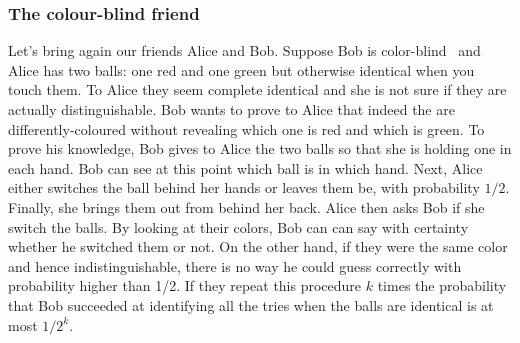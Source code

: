 \subsubsection{The colour-blind friend}

Let's bring again our friends Alice and Bob. Suppose Bob is color-blind~\cite{zkp:colour_blind} and Alice has two balls: one red and one green but otherwise identical when you touch them.
To Alice they seem complete identical and she is not sure if they are actually distinguishable. Bob wants to prove to Alice that indeed the are differently-coloured
without revealing which one is red and which is green. To prove his knowledge, Bob gives to Alice the two balls so that she is holding one in each hand. Bob can see
at this point which ball is in which hand. Next, Alice either switches the ball behind her hands or leaves them be, with probability $1/2$. Finally, she brings
them out from behind her back. Alice then asks Bob if she switch the balls. By looking at their colors, Bob can can say with certainty whether he switched them or not.
On the other hand, if they were the same color and hence indistinguishable, there is no way he could guess correctly with probability higher than 1/2. If they repeat
this procedure $k$ times the probability that Bob succeeded at identifying all the tries when the balls are identical is at most $1/2^{k}$.

